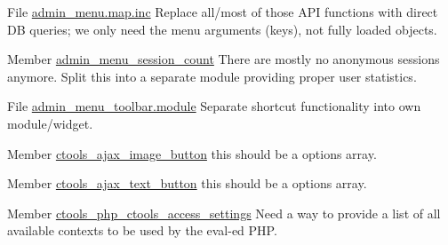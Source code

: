 \label{todo__todo000001}
\hypertarget{todo__todo000001}{}
 
\begin{DoxyDescription}
\item[File \hyperlink{admin__menu_8map_8inc}{admin\_\-menu.map.inc} ]Replace all/most of those API functions with direct DB queries; we only need the menu arguments (keys), not fully loaded objects. 
\end{DoxyDescription}

\label{todo__todo000002}
\hypertarget{todo__todo000002}{}
 
\begin{DoxyDescription}
\item[Member \hyperlink{admin__menu_8module_a6fe5151c8d300535152c76edffcf6f5d}{admin\_\-menu\_\-session\_\-count} ]There are mostly no anonymous sessions anymore. Split this into a separate module providing proper user statistics. 
\end{DoxyDescription}

\label{todo__todo000003}
\hypertarget{todo__todo000003}{}
 
\begin{DoxyDescription}
\item[File \hyperlink{admin__menu__toolbar_8module}{admin\_\-menu\_\-toolbar.module} ]Separate shortcut functionality into own module/widget. 
\end{DoxyDescription}

\label{todo__todo000004}
\hypertarget{todo__todo000004}{}
 
\begin{DoxyDescription}
\item[Member \hyperlink{ctools_2includes_2ajax_8inc_a00499a965fd0a192af2106a400c0e140}{ctools\_\-ajax\_\-image\_\-button} ]this should be a options array. 
\end{DoxyDescription}

\label{todo__todo000005}
\hypertarget{todo__todo000005}{}
 
\begin{DoxyDescription}
\item[Member \hyperlink{ctools_2includes_2ajax_8inc_aa20aff28acfb85cc21e49727d3126aad}{ctools\_\-ajax\_\-text\_\-button} ]this should be a options array. 
\end{DoxyDescription}

\label{todo__todo000015}
\hypertarget{todo__todo000015}{}
 
\begin{DoxyDescription}
\item[Member \hyperlink{php_8inc_ad173cf9e9891ef70924fad63a89396fa}{ctools\_\-php\_\-ctools\_\-access\_\-settings} ]Need a way to provide a list of all available contexts to be used by the eval-\/ed PHP. 
\end{DoxyDescription}


